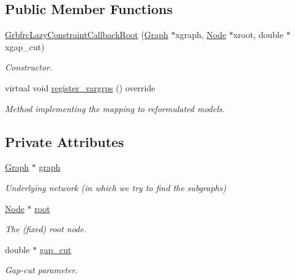 \subsection*{Public Member Functions}
\begin{DoxyCompactItemize}
\item 
\hyperlink{classderegnet_1_1GrbfrcLazyConstraintCallbackRoot_a56a7b25e09c0db1de37f46d5be41009d}{Grbfrc\+Lazy\+Constraint\+Callback\+Root} (\hyperlink{namespacederegnet_a55b76c55bbabc682cbc61f8b9948799e}{Graph} $\ast$xgraph, \hyperlink{namespacederegnet_a744bad34f2de9856d36715a445f027f3}{Node} $\ast$xroot, double $\ast$xgap\+\_\+cut)
\begin{DoxyCompactList}\small\item\em Constructor. \end{DoxyCompactList}\item 
virtual void \hyperlink{classderegnet_1_1GrbfrcLazyConstraintCallbackRoot_a257a89c84c5cf68ee764cc819f3a2653}{register\+\_\+vargrps} () override
\begin{DoxyCompactList}\small\item\em Method implementing the mapping to reformulated models. \end{DoxyCompactList}\end{DoxyCompactItemize}
\subsection*{Private Attributes}
\begin{DoxyCompactItemize}
\item 
\hyperlink{namespacederegnet_a55b76c55bbabc682cbc61f8b9948799e}{Graph} $\ast$ \hyperlink{classderegnet_1_1GrbfrcLazyConstraintCallbackRoot_a93e8aeef7796880ba2efa59770ed98ad}{graph}
\begin{DoxyCompactList}\small\item\em Underlying network (in which we try to find the subgraphs) \end{DoxyCompactList}\item 
\hyperlink{namespacederegnet_a744bad34f2de9856d36715a445f027f3}{Node} $\ast$ \hyperlink{classderegnet_1_1GrbfrcLazyConstraintCallbackRoot_a49a59d875ea23a1b443ec39b3c221e4d}{root}
\begin{DoxyCompactList}\small\item\em The (fixed) root node. \end{DoxyCompactList}\item 
double $\ast$ \hyperlink{classderegnet_1_1GrbfrcLazyConstraintCallbackRoot_aa396c45cfdd6231f7c93560f5ce3f013}{gap\+\_\+cut}
\begin{DoxyCompactList}\small\item\em Gap-\/cut parameter. \end{DoxyCompactList}\end{DoxyCompactItemize}


